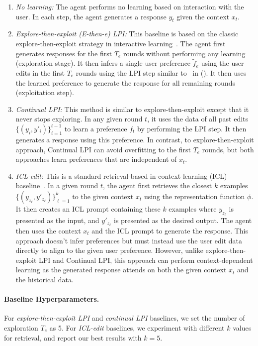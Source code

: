 \begin{enumerate}
    \item \textit{No learning:} The agent performs no learning based on interaction with the user. In each step, the agent generates a response $y_t$ given the context $x_t$.

    \item \textit{Explore-then-exploit (E-then-e) LPI:} This baseline is based on the classic explore-then-exploit strategy in interactive learning~\citep{garivier2016explore}. The agent first generates responses for the first $T_e$ rounds without performing any learning (exploration stage). It then infers a single user preference $\tilde{f}_e$ using the user edits in the first $T_e$ rounds using the LPI step similar to~ in \algname(). It then uses the learned preference to generate the response for all remaining rounds (exploitation step).

    \item \textit{Continual LPI:} This method is similar to explore-then-exploit except that it never stops exploring. In any given round $t$, it uses the data of all past edits~$\{(y_i, y'_i)\}_{i=1}^{t-1}$ to learn a preference $f_t$ by performing the LPI step. It then generates a response using this preference.
In contrast, to explore-then-exploit approach, Continual LPI can avoid overfitting to the first $T_e$ rounds, but both approaches learn preferences that are independent of $x_t$.
    \item \textit{ICL-edit:} This is a standard retrieval-based in-context learning (ICL) baseline~\citep{brown2020language}. In a given round $t$, the agent first retrieves the closest $k$ examples $\{(y_{z_\ell}, y'_{z_\ell})\}_{\ell=1}^k$ to the given context $x_t$ using the representation function $\phi$. It then creates an ICL prompt containing these $k$ examples where $y_{z_\ell}$ is presented as the input, and $y'_{z_\ell}$ is presented as the desired output. The agent then uses the context $x_t$ and the ICL prompt to generate the response. This approach doesn't infer preferences but must instead use the user edit data directly to align to the given user preference. However, unlike explore-then-exploit LPI and Continual LPI, this approach can perform context-dependent learning as the generated response attends on both the given context $x_t$ and the historical data.
\end{enumerate}

\paragraph{Baseline Hyperparameters.} For \textit{explore-then-exploit LPI} and \textit{continual LPI} baselines, we set the number of exploration $T_e$ as 5. For \textit{ICL-edit} baselines, we experiment with different $k$ values for retrieval, and report our best results with $k=5$.

